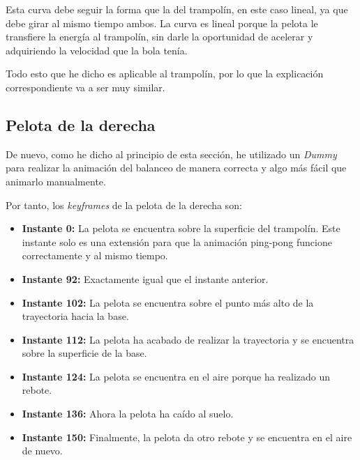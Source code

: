 
Esta curva debe seguir la forma que la del trampolín, en este caso lineal, ya que debe girar al mismo tiempo ambos. La curva es lineal porque la pelota le transfiere la energía al trampolín, sin darle la oportunidad de acelerar y adquiriendo la velocidad que la bola tenía.

\bigskip

Todo esto que he dicho es aplicable al trampolín, por lo que la explicación correspondiente va a ser muy similar.

\bigskip




\newpage
\subsection{Pelota de la derecha}
De nuevo, como he dicho al principio de esta sección, he utilizado un \textit{Dummy} para realizar la animación del balanceo de manera correcta y algo más fácil que animarlo manualmente.

\bigskip

Por tanto, los \textit{keyframes} de la pelota de la derecha son:

\begin{itemize}
    \item \textbf{Instante 0: }La pelota se encuentra sobre la superficie del trampolín. Este instante solo es una extensión para que la animación ping-pong funcione correctamente y al mismo tiempo.
    \item \textbf{Instante 92: }Exactamente igual que el instante anterior.
    \item \textbf{Instante 102: }La pelota se encuentra sobre el punto más alto de la trayectoria hacia la base.
    \item \textbf{Instante 112: }La pelota ha acabado de realizar la trayectoria y se encuentra sobre la superficie de la base.
    \item \textbf{Instante 124: }La pelota se encuentra en el aire porque ha realizado un rebote.
    \item \textbf{Instante 136: }Ahora la pelota ha caído al suelo.
    \item \textbf{Instante 150: }Finalmente, la pelota da otro rebote y se encuentra en el aire de nuevo.
\end{itemize}

